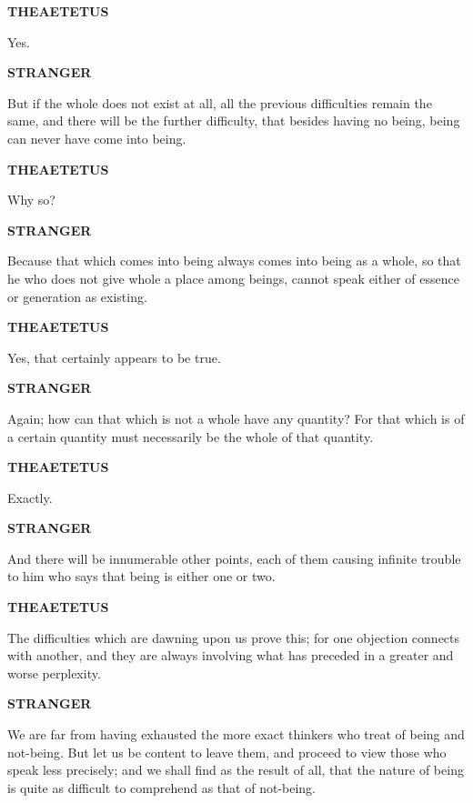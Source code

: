\documentclass[11pt,letter]{article}
\begin{document}
\par \textbf{THEAETETUS}
\par   Yes.

\par \textbf{STRANGER}
\par   But if the whole does not exist at all, all the previous difficulties remain the same, and there will be the further difficulty, that besides having no being, being can never have come into being.

\par \textbf{THEAETETUS}
\par   Why so?

\par \textbf{STRANGER}
\par   Because that which comes into being always comes into being as a whole, so that he who does not give whole a place among beings, cannot speak either of essence or generation as existing.

\par \textbf{THEAETETUS}
\par   Yes, that certainly appears to be true.

\par \textbf{STRANGER}
\par   Again; how can that which is not a whole have any quantity? For that which is of a certain quantity must necessarily be the whole of that quantity.

\par \textbf{THEAETETUS}
\par   Exactly.

\par \textbf{STRANGER}
\par   And there will be innumerable other points, each of them causing infinite trouble to him who says that being is either one or two.

\par \textbf{THEAETETUS}
\par   The difficulties which are dawning upon us prove this; for one objection connects with another, and they are always involving what has preceded in a greater and worse perplexity.

\par \textbf{STRANGER}
\par   We are far from having exhausted the more exact thinkers who treat of being and not-being. But let us be content to leave them, and proceed to view those who speak less precisely; and we shall find as the result of all, that the nature of being is quite as difficult to comprehend as that of not-being.
\end{document}
